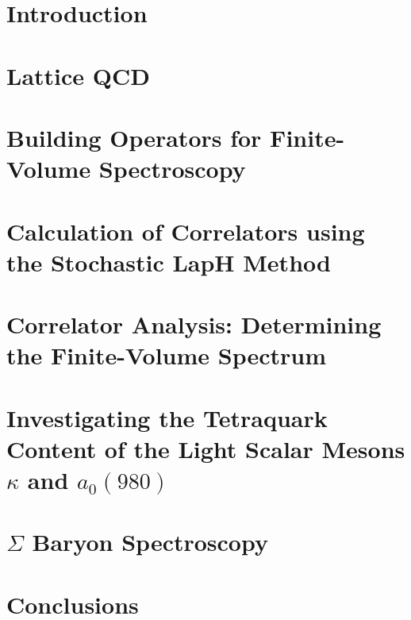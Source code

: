 \documentclass[12pt]{report}
\begin{document}
\chapter{Introduction}\label{ch:introduction}


\chapter{Lattice QCD}\label{ch:latticeqcd}


\chapter{Building Operators for Finite-Volume Spectroscopy}\label{ch:operators}


\chapter{Calculation of Correlators using the Stochastic LapH Method}\label{ch:montecarlo}


\chapter{Correlator Analysis: Determining the Finite-Volume Spectrum}\label{ch:analysis}


\chapter{Investigating the Tetraquark Content of the Light Scalar Mesons $\kappa$ and $a_0(980)$}\label{ch:tetraquarks}


\chapter{$\Sigma$ Baryon Spectroscopy}\label{ch:sigmas}


\chapter{Conclusions}\label{ch:conclusions}




\end{document}

